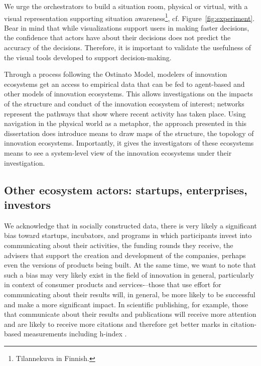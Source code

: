 We urge the orchestrators to build a situation room, physical or virtual, with a visual representation supporting situation awareness\footnote{Tilannekuva in Finnish.}, cf. Figure~\ref{fig:experiment}. Bear in mind that while visualizations support users in making faster decisions, the confidence that actors have about their decisions does not predict the accuracy of the decisions. Therefore, it is important to validate the usefulness of the visual tools developed to support decision-making.

Through a process following the Ostinato Model, modelers of innovation ecosystems get an access to empirical data that can be fed to agent-based and other models of innovation ecosystems. This allows investigations on the impacts of the structure and conduct \citep{Afuah2013,Ahuja2012TheNetworks} of the innovation ecosystem of interest; networks represent the pathways that show where recent activity has taken place.
Using navigation in the physical world as a metaphor, the approach presented in this dissertation does introduce means to draw maps of the structure, the topology of innovation ecosystems. Importantly, it gives the investigators of these ecosystems means to see a system-level view \citep{Pentland2015} of the innovation ecosystems under their investigation.

\subsection{Other ecosystem actors: startups, enterprises, investors}

We acknowledge that in socially constructed data, there is very likely a significant bias toward startups, incubators, and programs in which participants invest into communicating about their activities, the funding rounds they receive, the advisers that support the creation and development of the companies, perhaps even the versions of products being built. At the same time, we want to note that such a bias may very likely exist in the field of innovation in general, particularly in context of consumer products and services-–those that use effort for communicating about their results will, in general, be more likely to be successful and make a more significant impact. In scientific publishing, for example, those that communicate about their results and publications will receive more attention and are likely to receive more citations and therefore get better marks in citation-based measurements including h-index \citep[cf.][]{Terras2012}. 

